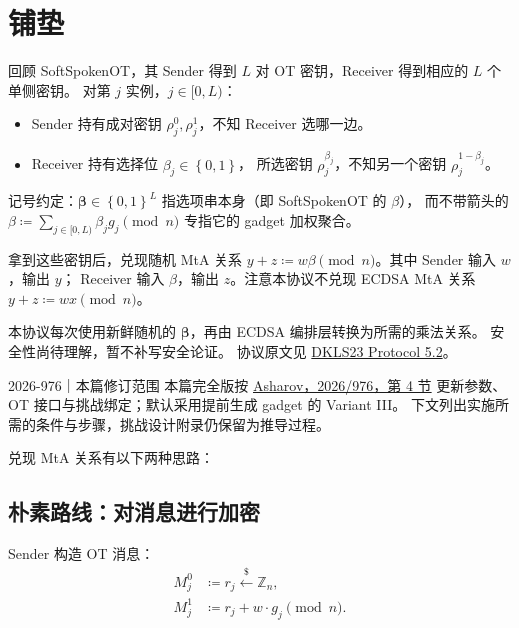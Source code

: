 

\section{铺垫}

回顾 SoftSpokenOT，其 Sender 得到 $L$ 对 OT 密钥，Receiver 得到相应的 $L$ 个单侧密钥。
对第 $j$ 实例，$j \in[0, L)$：

\begin{itemize}
  \item
        Sender 持有成对密钥 $\rho^0_j, \rho^1_j$，不知 Receiver 选哪一边。
  \item
        Receiver 持有选择位 $\beta_j\in\left\{0,1\right\}$，
        所选密钥 $\rho^{\beta_j}_j$，不知另一个密钥 $\rho_j^{1-\beta_j}$。
\end{itemize}

记号约定：$\boldsymbol\beta \in \left\{0,1\right\}^L$ 指选项串本身（即 SoftSpokenOT 的 $\beta$），
而不带箭头的 $\beta \coloneq \sum_{j\in[0,L)}\beta_j g_j \pmod n$ 专指它的 gadget 加权聚合。

拿到这些密钥后，兑现随机 MtA 关系 $y + z \coloneq w\beta \pmod n$。其中 Sender 输入 $w$，输出 $y$；
Receiver 输入 $\beta$，输出 $z$。注意本协议不兑现 ECDSA MtA 关系 $y + z \coloneq wx \pmod n$。

本协议每次使用新鲜随机的 $\boldsymbol\beta$，再由 ECDSA 编排层转换为所需的乘法关系。
安全性尚待理解，暂不补写安全论证。
协议原文见 \href{https://eprint.iacr.org/2023/765.pdf}{DKLS23 Protocol 5.2}。

\begin{patchnote}{2026-976｜本篇修订范围}
  本篇完全版按 \href{https://eprint.iacr.org/2026/976.pdf}{Asharov，2026/976，第 4 节}
  更新参数、OT 接口与挑战绑定；默认采用提前生成 gadget 的 Variant III。
  下文列出实施所需的条件与步骤，挑战设计附录仍保留为推导过程。
\end{patchnote}

兑现 MtA 关系有以下两种思路：

\subsection{朴素路线：对消息进行加密}

Sender 构造 OT 消息：
\begin{align}M^0_j & \coloneq r_j \stackrel{\$}{\leftarrow}\mathbb{Z}_n, \\
             M^1_j & \coloneq r_j + w\cdot g_j \pmod{n}.
\end{align}

